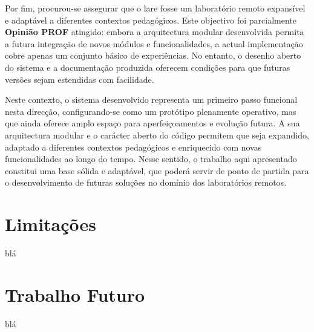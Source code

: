 Por fim, procurou-se assegurar que o \acrshort{lare} fosse um \acrshort{laboratório remoto} expansível e adaptável a diferentes contextos pedagógicos. Este objectivo foi parcialmente \textbf{Opinião PROF} atingido: embora a arquitectura modular desenvolvida permita a futura integração de novos módulos e funcionalidades, a actual implementação cobre apenas um conjunto básico de experiências. No entanto, o desenho aberto do sistema e a documentação produzida oferecem condições para que futuras versões sejam estendidas com facilidade.

Neste contexto, o sistema desenvolvido representa um primeiro passo funcional nesta direcção, configurando-se como um protótipo plenamente operativo, mas que ainda oferece amplo espaço para aperfeiçoamentos e evolução futura. A sua arquitectura modular e o carácter aberto do código permitem que seja expandido, adaptado a diferentes contextos pedagógicos e enriquecido com novas funcionalidades ao longo do tempo. Nesse sentido, o trabalho aqui apresentado constitui uma base sólida e adaptável, que poderá servir de ponto de partida para o desenvolvimento de futuras soluções no domínio dos laboratórios remotos.

\section{Limitações}
\label{limitacoes}
blá

\section{Trabalho Futuro}
\label{trabalho_futuro}
blá